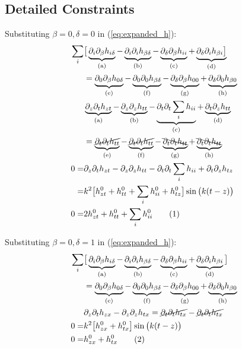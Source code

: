 \documentclass[]{article}
\newcommand\numberthis{\addtocounter{equation}{1}\tag{\theequation}}
\begin{document}
\subsection{Detailed Constraints}
Substituting $\beta=0,\delta=0$ in (\ref{eq:expanded_h}):
\begin{align*}
	\sum_i&\big[\underbrace{\partial_i\partial_\beta h_{i\delta}}_\text{(a)} - \underbrace{\partial_i\partial_i h_{\beta\delta}}_\text{(b)} -  \underbrace{\partial_\delta\partial_\beta h_{ii}}_\text{(c)} + \underbrace{\partial_\delta\partial_i h_{\beta i}\big]}_\text{(d)}\\
	&=\underbrace{\partial_0\partial_\beta h_{0\delta}}_\text{(e)}- \underbrace{\partial_0\partial_0 h_{\beta\delta}}_\text{(f)} - \underbrace{\partial_\delta\partial_\beta h_{00}}_\text{(g)} + \underbrace{\partial_\delta\partial_0 h_{\beta 0}}_\text{(h)} \\
	&\underbrace{\partial_z\partial_t h_{zt}}_\text{(a)} - \underbrace{\partial_z\partial_z h_{tt}}_\text{(b)} -  \underbrace{\partial_t\partial_t \sum_i h_{ii}}_\text{(c)} + \underbrace{\partial_t\partial_z h_{tt}}_\text{(d)}\\
	&=\underbrace{\cancel{\partial_t\partial_t h_{tt}}}_\text{(e)}- \underbrace{\cancel{\partial_t\partial_t h_{tt}}}_\text{(f)} - \underbrace{\bcancel{\partial_t\partial_t h_{tt}}}_\text{(g)} + \underbrace{\bcancel{\partial_t\partial_t h_{tt}}}_\text{(h)} \\
	0=&\partial_z\partial_t h_{zt} - \partial_z\partial_z h_{tt} -  \partial_t\partial_t \sum_i h_{ii} + \partial_t\partial_z h_{t z}\\
	=&k^2 \big[h^0_{zt}+h^0_{tt}+\sum_ih^0_{ii}+h^0_{tz}\big] \sin\big(k(t-z)\big)\\
	0=& 2h^0_{zt}+h^0_{tt}+\sum_ih^0_{ii} \numberthis \label{eq:con:00}
	\end{align*}
	
	Substituting $\beta=0,\delta=1$ in (\ref{eq:expanded_h}):
	\begin{align*}
	\sum_i&\big[\underbrace{\partial_i\partial_\beta h_{i\delta}}_\text{(a)} - \underbrace{\partial_i\partial_i h_{\beta\delta}}_\text{(b)} -  \underbrace{\partial_\delta\partial_\beta h_{ii}}_\text{(c)} + \underbrace{\partial_\delta\partial_i h_{\beta i}}_\text{(d)}\big]\\
	&=\underbrace{\partial_0\partial_\beta h_{0\delta}}_\text{(e)} - \underbrace{\partial_0\partial_0 h_{\beta\delta}}_\text{(f)} -  \underbrace{\partial_\delta\partial_\beta h_{00}}_\text{(g)} + \underbrace{\partial_\delta\partial_0 h_{\beta 0}}_\text{(h)}\\
	&\partial_z\partial_t h_{zx}-\partial_z\partial_z h_{tx}=\cancel{\partial_t\partial_t h_{tx}}-\cancel{\partial_t\partial_t h_{tx}}\\
	0=&k^2 \big[h^0_{zx}+h^0_{tx}\big] \sin\big(k(t-z)\big)\\
	0=&h^0_{zx}+h^0_{tx}  \numberthis \label{eq:con:01}
\end{align*}
\end{document}

